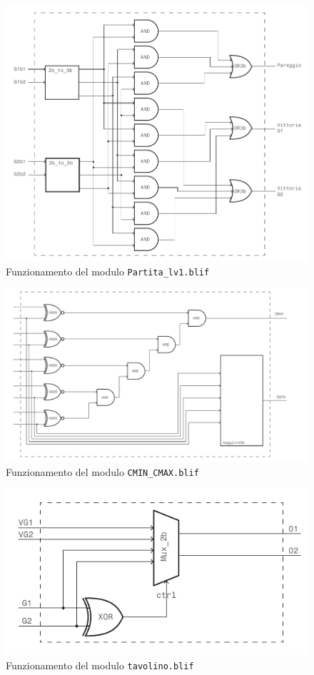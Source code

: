 \documentclass[a4paper]{report}
\begin{document}
\begin{figure}[h]
  \centering
  \includegraphics[scale=1]{partitalv1.pdf}
  \caption{Funzionamento del modulo \texttt{Partita\_lv1.blif} }
  \label{img:partitalv1}
\end{figure}

\begin{figure}[h]
  \centering
  \includegraphics[width=\textwidth]{cmincmax.pdf}
  \caption{Funzionamento del modulo \texttt{CMIN\_CMAX.blif} }
  \label{img:cmincmax}
\end{figure}

\begin{figure}[h]
  \centering
  \includegraphics[scale=1]{tavolino.pdf}
  \caption{Funzionamento del modulo \texttt{tavolino.blif} }
  \label{img:tavolino}
\end{figure}
\end{document}
